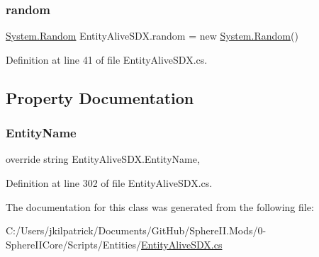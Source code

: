 \subsubsection{\texorpdfstring{random}{random}}
{\footnotesize\ttfamily \mbox{\hyperlink{_winter_mod_prefab_8cs_a24953b19d956caa76c403684c71b4e5b}{System.\+Random}} Entity\+Alive\+S\+D\+X.\+random = new \mbox{\hyperlink{_winter_mod_prefab_8cs_a24953b19d956caa76c403684c71b4e5b}{System.\+Random}}()}



Definition at line 41 of file Entity\+Alive\+S\+D\+X.\+cs.



\subsection{Property Documentation}
\mbox{\label{class_entity_alive_s_d_x_a279eafb6d3356725fc0b71bfd66f7c30}} 
\subsubsection{\texorpdfstring{EntityName}{EntityName}}
{\footnotesize\ttfamily override string Entity\+Alive\+S\+D\+X.\+Entity\+Name\hspace{0.3cm}{\ttfamily [get]}, {\ttfamily [set]}}



Definition at line 302 of file Entity\+Alive\+S\+D\+X.\+cs.



The documentation for this class was generated from the following file\+:\begin{DoxyCompactItemize}
\item 
C\+:/\+Users/jkilpatrick/\+Documents/\+Git\+Hub/\+Sphere\+I\+I.\+Mods/0-\/\+Sphere\+I\+I\+Core/\+Scripts/\+Entities/\mbox{\hyperlink{_entity_alive_s_d_x_8cs}{Entity\+Alive\+S\+D\+X.\+cs}}\end{DoxyCompactItemize}
